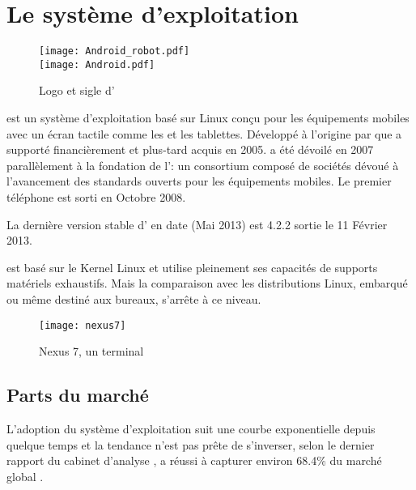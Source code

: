 \section{Le système d'exploitation \android{}}

\begin{figure}[H]
\begin{center}
\texttt{[image: Android\_robot.pdf]}\\
\texttt{[image: Android.pdf]}
\end{center}
\caption{Logo et sigle d'\android{}}
\end{figure}

\android{} est un système d'exploitation basé sur Linux conçu pour les
équipements mobiles avec un écran tactile comme les  et
les tablettes. Développé à l'origine par  que
 a supporté financièrement et plus-tard acquis en 2005.
\android{} a été dévoilé en 2007 parallèlement à la fondation de
l': un consortium composé de sociétés dévoué à
l'avancement des standards ouverts pour les équipements mobiles. Le
premier téléphone  \android{} est sorti en Octobre 2008.

La dernière version stable d'\android{} en date (Mai 2013) est 4.2.2
 sortie le 11 Février 2013.

\android{} est basé sur le Kernel Linux et utilise pleinement ses capacités de supports matériels exhaustifs. Mais la comparaison avec les distributions Linux, embarqué ou même destiné aux bureaux, s'arrête à ce niveau.~\cite{lft:growth_android}

\begin{figure}
\centering
\texttt{[image: nexus7]}
\caption{ Nexus 7, un terminal \android}
\end{figure}

\subsection{Parts du marché}

L’adoption du système d'exploitation \android{} suit une courbe
exponentielle depuis quelque temps et la tendance n'est pas prête de
s’inverser, selon le dernier rapport du cabinet d'analyse , \android{} a réussi à capturer environ 68.4\% du marché
global \cite{venturebeat.com}.

